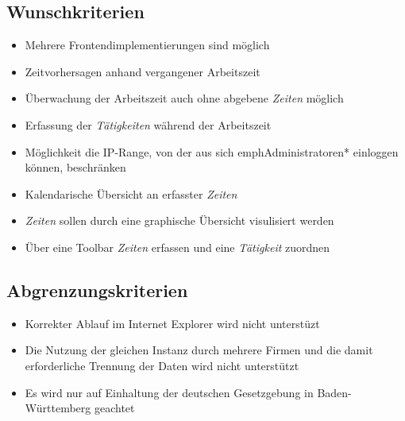 \subsection{Wunschkriterien}

\begin{itemize}
	\item Mehrere Frontendimplementierungen sind möglich
	\item Zeitvorhersagen anhand vergangener Arbeitszeit
	\item Überwachung der Arbeitszeit auch ohne abgebene \emph{Zeiten} möglich
	\item Erfassung der \emph{Tätigkeiten} während der Arbeitszeit
	\item Möglichkeit die IP-Range, von der aus sich emph{Administratoren*} einloggen können, beschränken
	\item Kalendarische Übersicht an erfasster \emph{Zeiten}
	\item \emph{Zeiten} sollen durch eine graphische Übersicht visulisiert werden
	\item Über eine Toolbar \emph{Zeiten} erfassen und eine \emph{Tätigkeit} zuordnen
\end{itemize}


\subsection{Abgrenzungskriterien}
\begin{itemize}
	\item Korrekter Ablauf im Internet Explorer wird nicht unterstüzt
	\item Die Nutzung der gleichen Instanz durch mehrere Firmen und die damit erforderliche Trennung der Daten wird nicht unterstützt
	\item Es wird nur auf Einhaltung der deutschen Gesetzgebung in Baden-Württemberg geachtet
\end{itemize}
